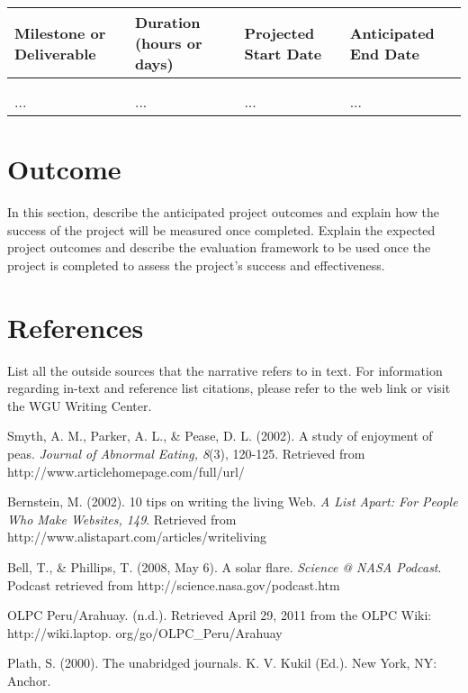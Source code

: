 \documentclass[12pt]{report}
\begin{document}
\begin{tabular}{|l|l|l|l|}
\hline
Milestone or Deliverable & Duration (hours or days) & Projected Start Date & Anticipated End Date \\
\hline
 &  &  &  \\
\hline
 &  &  &  \\
\hline
... & ... & ... & ... \\
\hline
\end{tabular}

\chapter*{Outcome}
In this section, describe the anticipated project outcomes and explain how the success of the project will be measured once completed. Explain the expected project outcomes and describe the evaluation framework to be used once the project is completed to assess the project’s success and effectiveness.

\chapter*{References}
List all the outside sources that the narrative refers to in text. For information regarding in-text and reference list citations, please refer to the web link or visit the WGU Writing Center.

\begin{thebibliography}{9}
Smyth, A. M., Parker, A. L., \& Pease, D. L. (2002). A study of enjoyment of peas. \textit{Journal of Abnormal Eating, 8}(3), 120-125. Retrieved from http://www.articlehomepage.com/full/url/

Bernstein, M. (2002). 10 tips on writing the living Web. \textit{A List Apart: For People Who Make Websites, 149}. Retrieved from http://www.alistapart.com/articles/writeliving

Bell, T., \& Phillips, T. (2008, May 6). A solar flare. \textit{Science @ NASA Podcast}. Podcast retrieved from http://science.nasa.gov/podcast.htm

OLPC Peru/Arahuay. (n.d.). Retrieved April 29, 2011 from the OLPC Wiki: http://wiki.laptop. org/go/OLPC_Peru/Arahuay

Plath, S. (2000). The unabridged journals. K. V. Kukil (Ed.). New York, NY: Anchor.
\end{thebibliography}
\end{document}
